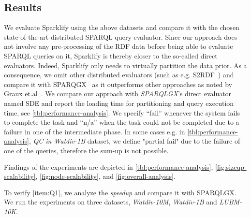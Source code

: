 \subsection{Results}
We evaluate Sparklify using the above datasets and compare it with the chosen state-of-the-art distributed SPARQL query evaluator.
Since our approach does not involve any pre-processing of the RDF data before being able to evaluate SPARQL queries on it, Sparklify is thereby closer to the so-called direct evaluators.
Indeed, Sparklify only needs to virtually partition the data prior.
As a consequence, we omit other distributed evaluators (such as e.g. S2RDF~\cite{Schatzle:2016:SRQ:2977797.2977806}) and compare it with SPARQGX~\cite{sparqlgx-iswc-2016} as it outperforms other approaches as noted by Graux et.al~\cite{sparqlgx-iswc-2016}.
We compare our approach with \emph{SPARQLGX}'s direct evaluator named SDE and report the loading time for partitioning and query execution time, see \autoref{tbl:performance-analysis}.
We specify ``fail'' whenever the system fails to complete the task and ``n/a'' when the task could not be completed due to a failure in one of the intermediate phase.
In some cases e.g. in \autoref{tbl:performance-analysis}, \textit{QC in Watdiv-1B} dataset, we define "partial fail" due to the failure of one of the queries, therefore the sum-up is not possible.

Findings of the experiments are depicted in \autoref{tbl:performance-analysis}, \autoref{fig:sizeup-scalability}, \autoref{fig:node-scalability}, and  \autoref{fig:overall-analysis}.

To verify \ref{item:Q1}, we analyze the \textit{speedup} and compare it with SPARQLGX.
We run the experiments on three datasets, \emph{Watdiv-10M}, \emph{Watdiv-1B} and \emph{LUBM-10K}.

